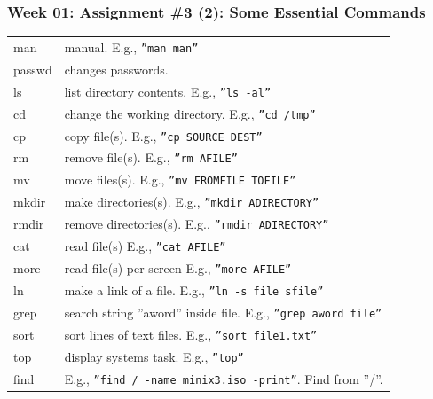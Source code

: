 \documentclass[xcolor=table, notheorems, hyperref={pdfpagelabels=false}]{beamer}
\begin{document}
\begin{frame}
\frametitle{Week 01: Assignment \#3 (2): Some Essential Commands}
\begin{tabular}{l l}
\hline
man    & manual. E.g., \texttt{''man man''}                                      \\
passwd & changes passwords.                                                    \\
ls     & list directory contents.  E.g., \texttt{''ls -al''}                     \\
cd     & change the working directory. E.g., \texttt{''cd /tmp''}                \\
cp     & copy file(s). E.g., \texttt{''cp SOURCE DEST''}                         \\
rm     & remove file(s).  E.g., \texttt{''rm AFILE''}                            \\
mv     & move files(s).        E.g., \texttt{''mv FROMFILE TOFILE''}             \\
mkdir  & make directories(s).        E.g., \texttt{''mkdir ADIRECTORY''}         \\
rmdir  & remove directories(s).        E.g., \texttt{''rmdir ADIRECTORY''}       \\
cat    & read file(s)      E.g., \texttt{''cat AFILE''}                          \\
more   & read file(s) per screen      E.g., \texttt{''more AFILE''}              \\
ln     & make a link of a file. E.g., \texttt{''ln -s file sfile''}              \\
grep   & search string ''aword'' inside file.  E.g., \texttt{''grep aword file''} \\
sort   & sort lines of text files. E.g., \texttt{''sort file1.txt''}             \\
top    & display systems task.  E.g., \texttt{''top''}                           \\
find   & E.g., \texttt{''find / -name minix3.iso -print''}. Find from ''/''.     \\
\hline
\end{tabular}
\end{frame}
\end{document}
